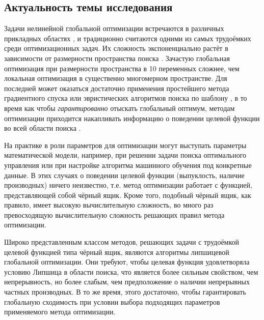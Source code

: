 
\subsection*{Актуальность темы исследования}

Задачи нелинейной глобальной оптимизации встречаются в различных прикладных областях \cite{Kvasov2013, Barkalov2013},
и традиционно считаются одними из самых трудоёмких среди оптимизационных задач.
Их сложность экспоненциально растёт в зависимости от размерности пространства поиска \cite{Vavasis1995}.
Зачастую глобальная оптимизация при размерности пространства в 10 переменных сложнее,
чем локальная оптимизация в существенно многомерном пространстве.
Для последней может оказаться достаточно применения простейшего метода градиентного спуска
или эвристических алгоритмов поиска по шаблону \cite{torczon1997},
в то время как чтобы \textit{гарантированно} отыскать глобальный оптимум, методам
оптимизации приходится накапливать информацию о поведении целевой функции во всей области поиска
\cite{Jones2009,Paulavicius2011,Evtushenko2013,Strongin2000}.

На практике в роли параметров для оптимизации могут выступать параметры математической модели, например, при решении
задачи поиска оптимального управления или при настройке алгоритма машинного обучения под конкретные данные.
В этих случаях о поведении целевой функции (выпуклость, наличие производных) ничего неизвестно, т.е. метод оптимизации
работает с функцией, представляющей собой чёрный ящик. Кроме того, подобный чёрный ящик, как правило,
имеет высокую вычислительную сложность, во много раз превосходящую вычислительную сложность решающих правил метода оптимизации.

Широко представленным классом методов, решающих задачи с трудоёмкой целевой функцией типа чёрный ящик, являются
алгоритмы липшицевой глобальной оптимизации. Они требуют, чтобы целевая функция удовлетворяла условию Липшица в области поиска,
что является более сильным свойством, чем непрерывность, но более слабым, чем предположение о наличии непрерывных частных производных.
В то же время, этого достаточно, чтобы гарантировать глобальную сходимость при условии выбора
подходящих параметров применяемого метода оптимизации.

